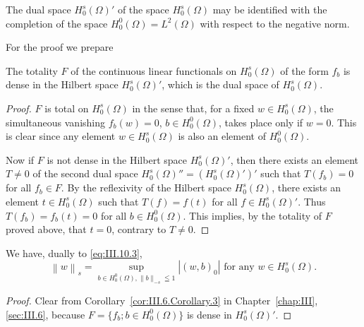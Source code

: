 \begin{theorem}\label{thm:III.10.Theorem.1} The dual space $H_0^s(\Omega)'$ of the space $H_0^s(\Omega)$ may be identified with the completion of the space $H_0^0(\Omega) = L^2(\Omega)$ with respect to the negative norm. 
\end{theorem}

For the proof we prepare 

\begin{propositionu} The totality $F$ of the continuous linear functionals on $H_0^s(\Omega)$ of the form $f_b$ is dense in the Hilbert space $H_0^s(\Omega)'$, which is the dual space of $H_0^s(\Omega)$. 
\end{propositionu}

\begin{proof}
 $F$ is total on $H_0^s(\Omega)$ in the sense that, for a fixed $w \in H_0^s(\Omega)$, the simultaneous vanishing $f_b(w) = 0$, $b \in H_0^0(\Omega)$, takes place only if $w = 0$. This is clear since any element $w \in H_0^s(\Omega)$ is also an element of $H_0^0(\Omega)$. 

Now if $F$ is not dense in the Hilbert space $H_0^s(\Omega)'$, then there exists an element $T \neq 0$ of the second dual space $H_0^s(\Omega)'' = (H_0^s(\Omega)')'$ such that $T(f_b) = 0$ for all $f_b \in F$. By the reflexivity of the Hilbert space $H_0^s(\Omega)$, there exists an element $t \in H_0^s(\Omega)$ such that $T(f) = f(t)$ for all $f \in H_0^s(\Omega)'$. Thus $T(f_b) = f_b(t) = 0$ for all $b \in H_0^0(\Omega)$. This implies, by the totality of $F$ proved above, that $t = 0$, contrary to $T \neq 0$. 
\end{proof}
\begin{corollaryu} We have, dually to \eqref{eq:III.10.3}, 
\begin{equation}\label{eq:III.10.6}
\left\| w \right\| _{s} = \sup\limits _ {b \in H _{0} ^{0} (\Omega), \| b \| _{-s} \leqq 1} \left| (w, b) _{0} \right| \text{ for any } w \in H _{0} ^{s} (\Omega).
\end{equation}
\end{corollaryu}

\begin{proof}
 Clear from Corollary~\ref{cor:III.6.Corollary.3} in Chapter~\ref{chap:III}, \ref{sec:III.6}, because $F = \{f_b; b \in H_0^0(\Omega)\}$ is dense in $H_0^s(\Omega)'$. 
\end{proof}

